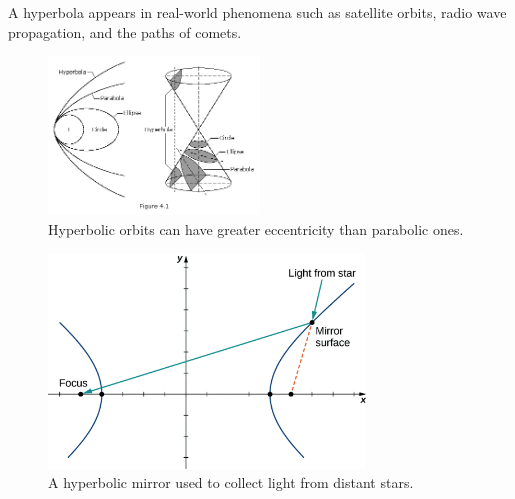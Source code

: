 \documentclass{article}
\begin{document}
\begin{intuitionbox}
A hyperbola appears in real-world phenomena such as satellite orbits, radio wave propagation, and the paths of comets.
\begin{figure}[H]
    \centering
    \includegraphics[width=0.5\textwidth]{hyperbola_comparison_to_other_shapes.png}
    \caption{Hyperbolic orbits can have greater eccentricity than parabolic ones.}
\end{figure}
\begin{figure}[H]
    \centering
    \includegraphics[width=0.75\textwidth]{example_light_hyperbola.jpg}
    \caption{ A hyperbolic mirror used to collect light from distant stars.}
\end{figure}
\end{intuitionbox}
\end{document}
